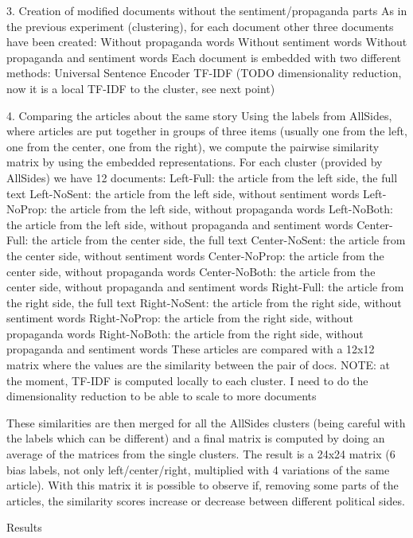 3. Creation of modified documents without the sentiment/propaganda parts
As in the previous experiment (clustering), for each document other three documents have been created:
Without propaganda words
Without sentiment words
Without propaganda and sentiment words
Each document is embedded with two different methods:
Universal Sentence Encoder
TF-IDF (TODO dimensionality reduction, now it is a local TF-IDF to the cluster, see next point)


4. Comparing the articles about the same story
Using the labels from AllSides, where articles are put together in groups of three items (usually one from the left, one from the center, one from the right), we compute the pairwise similarity matrix by using the embedded representations.
For each cluster (provided by AllSides) we have 12 documents:
Left-Full: the article from the left side, the full text
Left-NoSent: the article from the left side, without sentiment words
Left-NoProp: the article from the left side, without propaganda words
Left-NoBoth: the article from the left side, without propaganda and sentiment words
Center-Full: the article from the center side, the full text
Center-NoSent: the article from the center side, without sentiment words
Center-NoProp: the article from the center side, without propaganda words
Center-NoBoth: the article from the center side, without propaganda and sentiment words
Right-Full: the article from the right side, the full text
Right-NoSent: the article from the right side, without sentiment words
Right-NoProp: the article from the right side, without propaganda words
Right-NoBoth: the article from the right side, without propaganda and sentiment words
These articles are compared with a 12x12 matrix where the values are the similarity between the pair of docs.
NOTE: at the moment, TF-IDF is computed locally to each cluster. I need to do the dimensionality reduction to be able to scale to more documents

These similarities are then merged for all the AllSides clusters (being careful with the labels which can be different) and a final matrix is computed by doing an average of the matrices from the single clusters.
The result is a 24x24 matrix (6 bias labels, not only left/center/right, multiplied with 4 variations of the same article).
With this matrix it is possible to observe if, removing some parts of the articles, the similarity scores increase or decrease between different political sides.


Results


